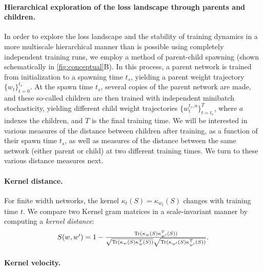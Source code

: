 \documentclass{article}
\begin{document}
%

%

%


%

\vspace{-0.3cm}
\paragraph{Hierarchical exploration of the loss landscape through parents and children.}
In order to explore the loss landscape and the stability of training dynamics in a more multiscale hierarchical manner than is possible using completely independent training runs, we employ a method of parent-child spawning \cite{frankle2019linear} (shown schematically in \cref{fig:conceptual}B). 
In this process, a parent network is trained from initialization to a spawning time $t_s$, yielding a parent weight trajectory $\{w_t\}_{t=0}^{t_s}$. 
At the spawn time $t_s$, several copies of the parent network are made, and these so-called children are then trained with independent minibatch stochasticity, yielding different child weight trajectories $\{w^{t_s,a}_t\}_{t=t_s}^{T}$, where $a$ indexes the children, and $T$ is the final training time. 
We will be interested in various measures of the distance between children after training, as a function of their spawn time $t_s$, as well as measures of the distance between the same network (either parent or child) at two different training times.  We turn to these various distance measures next.  


%
%
%
%
%
%

\vspace{-0.3cm}
\paragraph{Kernel distance.}

For finite width networks, the kernel $\kappa_{t}(S)=\kappa_{w_t}(S)$ changes with training time $t$. We compare two Kernel gram matrices in a scale-invariant manner by computing a \emph{kernel distance}:
\[\nonumber\textstyle
S(w,w') = 1-\frac{ \mathrm{Tr}  (\kappa_w(S) \kappa_{w'}^T(S) ) }{ \sqrt{ \mathrm{Tr} (\kappa_w(S) \kappa_{w}^T(S) ) } \sqrt{ \mathrm{Tr} (\kappa_{w'}(S) \kappa_{w'}^T(S) ) }}.
\]
%

\vspace{-0.3cm}
\paragraph{Kernel velocity.}
\end{document}
